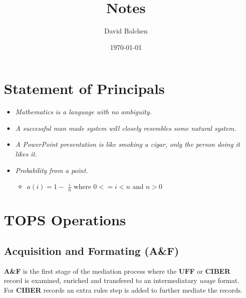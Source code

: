 \documentclass[12pt,twoside]{article}
\author{David Balchen}
\date{\today}
\title{Notes}
\begin{document}
\maketitle
\pagenumbering{}
\clearpage
\addtolength{\oddsidemargin}{-.25in}
\addtolength{\evensidemargin}{-01.25in}
\addtolength{\textwidth}{1.4in}
\addtolength{\topmargin}{-1.25in}
\addtolength{\textheight}{2.45in}
\setcounter{tocdepth}{3}
\vspace*{1cm} 
\newpage
{}
\setcounter{tocdepth}{2}
\pagestyle{fancy}
\fancyhf[C]{}
\setcounter{tocdepth}{2}
\tableofcontents
 \newpage
{}
\section{Statement of Principals}
\label{sec:orgheadline1}
\begin{itemize}
\item \emph{Mathematics is a language with no ambiguity.}
\item \emph{A successful man made system will closely resembles some natural system.}
\item \emph{A PowerPoint presentation is like smoking a cigar, only the
person doing it likes it.}
\item \emph{Probability from a point.}
\begin{itemize}
\item \(a(i) = 1-\) \Large \(\frac{i}{n}\) \normalsize where \(0 <= i < n\) and \(n > 0\)
\end{itemize}
\end{itemize}
\section{TOPS Operations}
\label{sec:orgheadline16}
\subsection{Acquisition and Formating (A\&F)}
\label{sec:orgheadline2}
\textbf{A\&F} is the first stage of the mediation process where the \textbf{UFF} or \textbf{CIBER} record is examined, enriched 
and transfered to an intermediatary \emph{usage} format. For \textbf{CIBER} records an extra rules step is 
added to further mediate the records.
\end{document}
